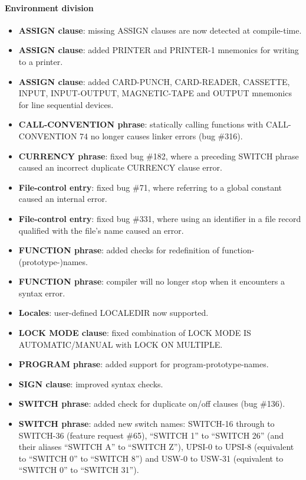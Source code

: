 \paragraph{Environment division}
\begin{itemize}
\item \textbf{ASSIGN clause}: missing ASSIGN clauses are now detected at compile-time.
\item \textbf{ASSIGN clause}: added PRINTER and PRINTER-1 mnemonics for writing to a printer.
\item \textbf{ASSIGN clause}: added CARD-PUNCH, CARD-READER, CASSETTE, INPUT, INPUT-OUTPUT, MAGNETIC-TAPE and OUTPUT mnemonics for line sequential devices.
\item \textbf{CALL-CONVENTION phrase}: statically calling functions with CALL-CONVENTION 74 no longer causes linker errors (bug \#316).
\item \textbf{CURRENCY phrase}: fixed bug \#182, where a preceding SWITCH phrase caused an incorrect duplicate CURRENCY clause error.
\item \textbf{File-control entry}: fixed bug \#71, where referring to a global constant caused an internal error.
\item \textbf{File-control entry}: fixed bug \#331, where using an identifier in a file record qualified with the file's name caused an error.
\item \textbf{FUNCTION phrase}: added checks for redefinition of function-(prototype-)names.
\item \textbf{FUNCTION phrase}: compiler will no longer stop when it encounters a syntax error.
\item \textbf{Locales}: user-defined LOCALEDIR now supported.
\item \textbf{LOCK MODE clause}: fixed combination of LOCK MODE IS AUTOMATIC/MANUAL with LOCK ON MULTIPLE.
\item \textbf{PROGRAM phrase}: added support for program-prototype-names.
\item \textbf{SIGN clause}: improved syntax checks.
\item \textbf{SWITCH phrase}: added check for duplicate on\slash{}off clauses (bug \#136).
\item \textbf{SWITCH phrase}: added new switch names: SWITCH-16 through to SWITCH-36 (feature request \#65), ``SWITCH 1'' to ``SWITCH 26'' (and their aliases  ``SWITCH A'' to ``SWITCH Z''), UPSI-0 to UPSI-8 (equivalent to ``SWITCH 0'' to ``SWITCH 8'') and USW-0 to USW-31 (equivalent to ``SWITCH 0'' to ``SWITCH 31'').
\end{itemize}

